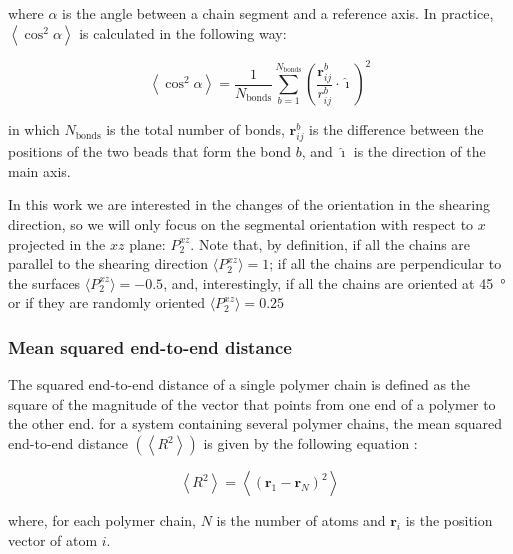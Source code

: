 \documentclass[aps,prb,reprint,superscriptaddress, a4paper]{revtex4-1}
\begin{document}
where $\alpha$ is the angle between a chain segment and a reference axis. In practice, $\left\langle \cos ^2 \alpha \right\rangle$ is calculated in the following way:

\begin{equation}
\left\langle \cos ^2 \alpha \right\rangle = \frac{1}{N_\text{bonds}} \sum_{b=1}^{N_\text{bonds}} \left(\frac{\textbf{r}^b_{ij}}{r^b_{ij}} \cdot \mathbf{\hat \imath} \right)^2
\end{equation}

 in which $N_\text{bonds}$ is the total number of bonds, $\textbf{r}^b_{ij}$ is the difference between the positions of the two beads that form the bond $b$, and $\mathbf{\hat \imath}$ is the direction of the main axis. 
 
 In this work we are interested in  the changes of the orientation in the shearing direction, so we will only focus on  the segmental orientation with respect to $x$ projected in the $xz$ plane: $P_{2}^{xz}$. Note that, by definition,  if all the chains are parallel to the shearing direction $\langle P_{2}^{xz}\rangle=1 $; if all the chains are perpendicular to the surfaces   $\langle P_{2}^{xz} \rangle=-0.5$, and, interestingly, if all the chains are oriented at  \SI{45}{\degree} or if they are randomly oriented $\langle P_{2}^{xz}\rangle=0.25 $
 

\subsubsection{Mean squared end-to-end distance}


The  squared end-to-end distance  of a single polymer chain is defined as the square  of the magnitude of  the vector that points from one end of a polymer to the other end. for a system containing several polymer chains, the mean squared end-to-end distance $\left(\left< R^2 \right>\right)$ is given by the following equation \cite{Brown1994}:

\begin{equation}
	\left< R^2 \right> = \left<\left( \mathbf{r}_1 - \mathbf{r}_N \right)^2\right>
	\label{eq:e2e2}
\end{equation}

where, for each polymer chain,  $N$ is the number of atoms and  $ \mathbf{r}_i$ is the position vector of atom $i$. 

\end{document}
